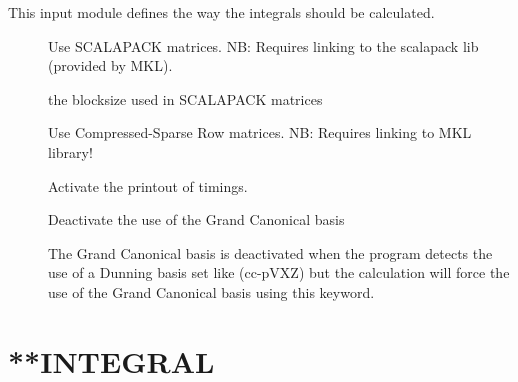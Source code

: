 This input module defines the way the integrals should be calculated.
\begin{description}

\item[] Use SCALAPACK matrices. \newline
NB: Requires linking to the scalapack lib (provided by MKL).
\item[] the blocksize used in SCALAPACK matrices
\item[] Use Compressed-Sparse Row matrices. NB: Requires linking to MKL library!
\item[] Activate the printout of timings.
\item[] Deactivate the use of the Grand Canonical basis \cite{trilevel1, trilevel2}
\item[] The Grand Canonical basis \cite{trilevel1, trilevel2} is deactivated when the program
detects the use of a Dunning basis set like (cc-pVXZ) but the calculation will force the use of the Grand Canonical basis using this keyword.

\end{description}
\section{**INTEGRAL}\label{sec:integral}

